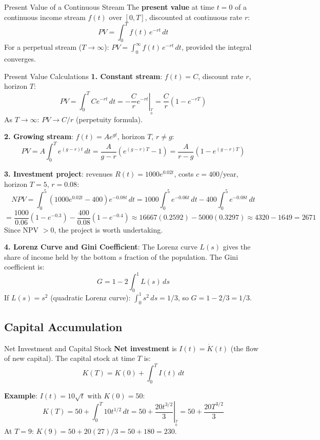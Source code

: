 \documentclass[12pt, a4paper]{article}
\theoremstyle{definition}
\newcommand{\dd}[1]{\,d#1}
\newcommand{\eval}[2]{\left.#1\right|_{#2}}
\begin{document}
\begin{defbox}{Present Value of a Continuous Stream}
The \textbf{present value} at time $t=0$ of a continuous income stream
$f(t)$ over $[0,T]$, discounted at continuous rate $r$:
\[
  PV = \int_0^T f(t)\,e^{-rt}\dd{t}
\]
For a perpetual stream ($T \to \infty$):
$PV = \displaystyle\int_0^\infty f(t)\,e^{-rt}\dd{t}$, provided the integral converges.
\end{defbox}
\newpage
\begin{exbox}{Present Value Calculations}
\textbf{1. Constant stream}: $f(t)=C$, discount rate $r$, horizon $T$:
\[
  PV = \int_0^T Ce^{-rt}\dd{t}
     = \eval{-\frac{C}{r}e^{-rt}}{_0^T}
     = \frac{C}{r}(1-e^{-rT})
\]
As $T\to\infty$: $PV \to C/r$ (perpetuity formula).

\textbf{2. Growing stream}: $f(t) = Ae^{gt}$, horizon $T$, $r\neq g$:
\[
  PV = A\int_0^T e^{(g-r)t}\dd{t}
     = \frac{A}{g-r}\left(e^{(g-r)T}-1\right)
     = \frac{A}{r-g}\left(1-e^{(g-r)T}\right)
\]

\textbf{3. Investment project}: revenues $R(t)=1000e^{0.02t}$,
costs $c=400$/year, horizon $T=5$, $r=0.08$:
\[
  NPV = \int_0^5(1000e^{0.02t}-400)e^{-0.08t}\dd{t}
      = 1000\int_0^5 e^{-0.06t}\dd{t} - 400\int_0^5 e^{-0.08t}\dd{t}
\]
\[
  = \frac{1000}{0.06}(1-e^{-0.3}) - \frac{400}{0.08}(1-e^{-0.4})
  \approx 16667(0.2592) - 5000(0.3297)
  \approx 4320 - 1649 = 2671
\]
Since NPV $>0$, the project is worth undertaking.

\textbf{4. Lorenz Curve and Gini Coefficient}:
The Lorenz curve $L(s)$ gives the share of income held by the bottom
$s$ fraction of the population. The Gini coefficient is:
\[
  G = 1 - 2\int_0^1 L(s)\dd{s}
\]
If $L(s)=s^2$ (quadratic Lorenz curve):
$\int_0^1 s^2\dd{s} = 1/3$, so $G = 1-2/3 = 1/3$.
\end{exbox}

\subsection{Capital Accumulation}

\begin{exbox}{Net Investment and Capital Stock}
\textbf{Net investment} is $I(t) = \dot K(t)$ (the flow of new capital).
The capital stock at time $T$ is:
\[
  K(T) = K(0) + \int_0^T I(t)\dd{t}
\]

\textbf{Example}: $I(t) = 10\sqrt{t}$ with $K(0) = 50$:
\[
  K(T) = 50 + \int_0^T 10t^{1/2}\dd{t}
       = 50 + \eval{\frac{20t^{3/2}}{3}}{_0^T}
       = 50 + \frac{20T^{3/2}}{3}
\]
At $T=9$: $K(9) = 50 + 20(27)/3 = 50+180 = 230$.
\end{exbox}
\end{document}
